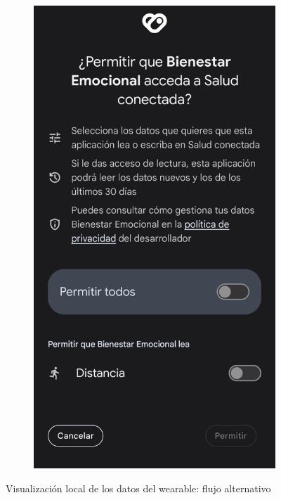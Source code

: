 \begin{figure}[htbp]
\begin{subfigure}[c]{0.27\textwidth}
                    \includegraphics[width=1\linewidth]{figures/pruebas/local_wearable/Permiso distancia.png}
                \end{subfigure}
                \caption{Visualización local de los datos del wearable: flujo alternativo}
                \label{figure:pruebas:visualizacion_local:alternativo}
            \end{figure}


